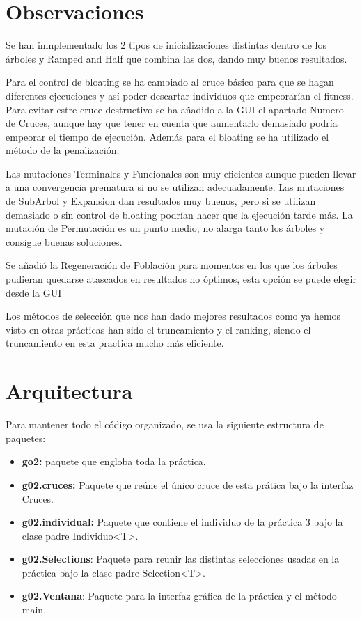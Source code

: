 \documentclass[twoside]{AiTeX}
\begin{document}

\section{Observaciones}

Se han imnplementado los 2 tipos de inicializaciones distintas dentro de los árboles y Ramped and Half que combina las dos, dando muy buenos resultados.

Para el control de bloating se ha cambiado al cruce básico para que se hagan diferentes ejecuciones y así poder descartar individuos que empeorarían el fitness. Para evitar estre cruce destructivo se ha añadido a la GUI el apartado Numero de Cruces, aunque hay que tener en cuenta que aumentarlo demasiado podría empeorar el tiempo de ejecución.
Además para el bloating se ha utilizado el método de la penalización.

Las mutaciones Terminales y Funcionales son muy eficientes aunque pueden llevar a una convergencia prematura si no se utilizan adecuadamente.
Las mutaciones de SubArbol y Expansion dan resultados muy buenos, pero si se utilizan demasiado o sin control de bloating podrían hacer que la ejecución tarde más.
La mutación de Permutación es un punto medio, no alarga tanto los árboles y consigue buenas soluciones.

Se añadió la Regeneración de Población para momentos en los que los árboles pudieran quedarse atascados en resultados no óptimos, esta opción se puede elegir desde la GUI

Los métodos de selección que nos han dado mejores resultados como ya hemos visto en otras prácticas han sido el truncamiento y el ranking, siendo el truncamiento en esta practica mucho más eficiente.

\section{Arquitectura}

Para mantener todo el código organizado, se usa la siguiente estructura de paquetes:

\begin{itemize}
    \item\textbf{go2:} paquete que engloba toda la práctica.
    \item\textbf{g02.cruces:} Paquete que reúne el único cruce de esta prática bajo la interfaz Cruces.
    \item\textbf{g02.individual:} Paquete que contiene el individuo de la práctica 3 bajo la clase padre Individuo<T>.
    \item\textbf{g02.Selections}: Paquete para reunir las distintas selecciones usadas en la práctica bajo la clase padre Selection<T>.
    \item\textbf{g02.Ventana}: Paquete para la interfaz gráfica de la práctica y el método main.
\end{itemize}
\end{document}
